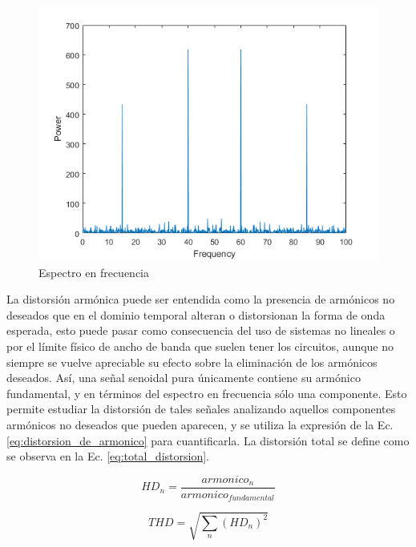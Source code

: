 \begin{figure}[H]
    \centering
    \includegraphics[scale=0.45]{../EJ3/Recursos/BasicSpectralAnalysisExample_01.png} 
    \caption{Espectro en frecuencia}
\end{figure}

La distorsi\'on arm\'onica puede ser entendida como la presencia de arm\'onicos no deseados que en el dominio temporal alteran o distorsionan la forma
de onda esperada, esto puede pasar como consecuencia del uso de sistemas no lineales o por el l\'imite f\'isico de ancho de banda que suelen tener
los circuitos, aunque no siempre se vuelve apreciable su efecto sobre la eliminaci\'on de los arm\'onicos deseados.
As\'i, una se\~nal senoidal pura \'unicamente contiene su arm\'onico fundamental, y en t\'erminos del espectro en frecuencia s\'olo una componente. Esto permite
estudiar la distorsi\'on de tales se\~nales analizando aquellos componentes arm\'onicos no deseados que pueden aparecen, y se utiliza la expresi\'on de la Ec. \ref{eq:distorsion_de_armonico}
para cuantificarla. La distorsi\'on total se define como se observa en la Ec. \ref{eq:total_distorsion}.

\begin{equation}
    HD_n = \frac{armonico_n}{armonico_{fundamental}}
    \label{eq:distorsion_de_armonico}
\end{equation}

\begin{equation}
    THD = \sqrt{\sum_{n} (HD_n)^{2}}
    \label{eq:total_distorsion}
\end{equation}

